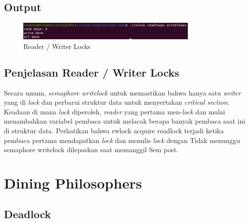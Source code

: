 \documentclass[11pt,a4paper]{article}
\begin{document}
\subsection{Output}
\begin{figure}[h]
    \centering
    \includegraphics[width=0.8\textwidth]{Figure/read lock.png}
    \caption{Reader / Writer Locks}
    \label{fig:my_label}
\end{figure}

\subsection{Penjelasan Reader / Writer Locks}
Secara umum, \textit{semaphore writelock} untuk memastikan bahwa hanya satu \textit{writer} yang di \textit{lock} dan perbarui struktur data untuk menyertakan \textit{critical section}. Keadaan di mana \textit{lock} diperoleh, \textit{reader} yang pertama men-\textit{lock} dan mulai menambahkan variabel pembaca untuk melacak berapa banyak pembaca saat ini di struktur data. Perhatikan bahwa rwlock acquire readlock terjadi ketika pembaca pertama mendapatkan \textit{lock} dan menulis \textit{lock} dengan Tidak menunggu semaphore writelock dilepaskan saat memanggil Sem post.

\section{Dining Philosophers}
\subsection{Deadlock}
\end{document}
